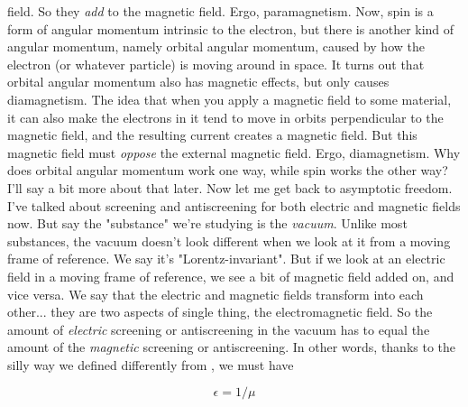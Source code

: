 field.  So they \emph{add} to the magnetic field.  Ergo, paramagnetism.
Now, spin is a form of angular momentum intrinsic to the electron,
but there is another kind of angular momentum, namely orbital angular
momentum, caused by how the electron (or whatever particle) is moving 
around in space.  It turns out that orbital angular momentum also
has magnetic effects, but only causes diamagnetism.  The idea 
that when you apply a magnetic field to some material, it can also make
the electrons in it tend to move in orbits perpendicular to the
magnetic field, and the resulting current creates a magnetic field.
But this magnetic field must \emph{oppose} the external magnetic field.
Ergo, diamagnetism.  
Why does orbital angular momentum work one way, while spin works
the other way?  I'll say a bit more about that later. Now let
me get back to asymptotic freedom.
I've talked about screening and antiscreening for both electric
and magnetic fields now.  But say the "substance" we're studying
is the \emph{vacuum}.  Unlike most substances, the vacuum doesn't look
different when we look at it from a moving frame of reference.  We
say it's "Lorentz-invariant".  But if we look at an electric field 
in a moving frame of reference, we see a bit of magnetic field
added on, and vice versa.   We say that the electric and magnetic
fields transform into each other... they are two aspects of single
thing, the electromagnetic field.  So the amount of \emph{electric} screening
or antiscreening in the vacuum has to equal the amount of the 
\emph{magnetic} screening or antiscreening.  In other words, thanks to
the silly way we defined \epsilon  differently from \mu , we must have

$$

                       \epsilon  = 1/\mu 
$$
    
